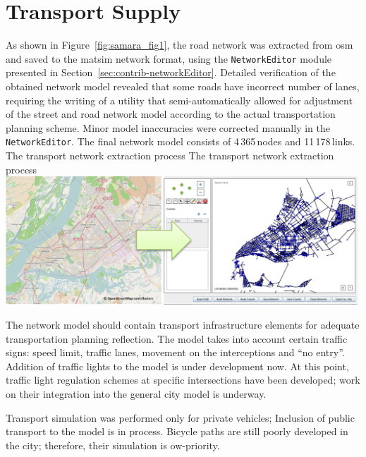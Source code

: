 \section{Transport Supply}
As shown in Figure~\ref{fig:samara_fig1}, the road network was extracted from \gls{osm} and saved to the \gls{matsim} network format, using the \lstinline|NetworkEditor| module presented in Section~\ref{sec:contrib-networkEditor}. 
Detailed verification of the obtained network model revealed that some roads have incorrect number of lanes, requiring the writing of a utility that semi-automatically allowed for adjustment of the street and road network model according to the actual transportation planning scheme. Minor model inaccuracies were corrected manually in the \lstinline|NetworkEditor|. The final network model consists of 4\,365\,nodes and 11\,178\,links.
%
\createfigure%
{The transport network extraction process}%
{The transport network extraction process}%
{\label{fig:samara_fig1}}%
{\includegraphics[width=0.99\textwidth, angle=0]{./scenarios/figures/samara_fig1.png}}%
{}

The network model should contain transport infrastructure elements for adequate transportation planning reflection. The model takes into account certain traffic signs: speed limit, traffic lanes, movement on the interceptions and ``no entry''. Addition of traffic lights to the model is under development now. At this point, traffic light regulation schemes at specific intersections have been developed; work on their integration into the general city model is underway.

Transport simulation was performed only for private vehicles; Inclusion of public transport to the model is in process. Bicycle paths are still poorly developed in the city; therefore, their simulation is ow-priority. 

